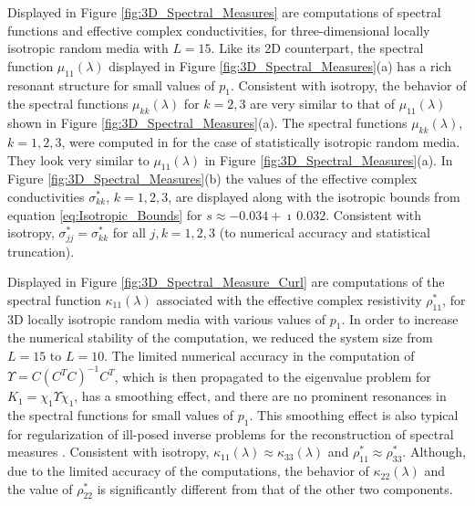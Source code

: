 \documentclass{cmslatex}
\begin{document}
Displayed in Figure \ref{fig:3D_Spectral_Measures} are 
computations of spectral functions and effective complex
conductivities, for three-dimensional locally isotropic random media
with $L=15$. Like its 2D counterpart, the spectral 
function $\mu_{11}(\lambda)$ displayed in Figure
\ref{fig:3D_Spectral_Measures}(a) has a rich resonant structure for
small values of $p_1$. Consistent with isotropy, the behavior of the
spectral functions $\mu_{kk}(\lambda)$ for $k=2,3$ are very similar to that of
$\mu_{11}(\lambda)$ shown in Figure \ref{fig:3D_Spectral_Measures}(a). The
spectral functions $\mu_{kk}(\lambda)$, $k=1,2,3$, were computed in
\cite{Murphy:JMP:063506} for the case of statistically isotropic
random media. They look very similar to $\mu_{11}(\lambda)$ in Figure
\ref{fig:3D_Spectral_Measures}(a). In Figure
\ref{fig:3D_Spectral_Measures}(b) the values of the effective complex
conductivities $\sigma^*_{kk}$, $k=1,2,3$, are displayed along with the
isotropic bounds from equation \eqref{eq:Isotropic_Bounds} for
$s\approx-0.034+\imath\,0.032$. Consistent with isotropy, $\sigma^*_{jj}=\sigma^*_{kk}$ for
all $j,k=1,2,3$ (to numerical accuracy and statistical truncation).




Displayed in Figure \ref{fig:3D_Spectral_Measure_Curl} are 
computations of the spectral function $\kappa_{11}(\lambda)$ associated with the
effective complex resistivity $\rho^*_{11}$, for 3D
locally isotropic random media with various values of $p_1$. In order
to increase the numerical stability of the computation, we reduced the 
system size from $L=15$ to $L=10$. The limited numerical accuracy
in the computation of $\Upsilon=C(C^TC)^{-1}C^T$, which is then propagated to
the eigenvalue problem for $K_1=\chi_1\Upsilon\chi_1$, has a smoothing effect, and
there are no prominent resonances in the spectral functions for small
values of $p_1$. This smoothing effect is also typical for
regularization of ill-posed inverse problems for the reconstruction of
spectral measures \cite{Cherkaev:IP-1203}. Consistent with isotropy,
$\kappa_{11}(\lambda)\approx\kappa_{33}(\lambda)$ and $\rho^*_{11}\approx\rho^*_{33}$. Although, due to the
limited accuracy of the computations, the behavior of $\kappa_{22}(\lambda)$ and
the value of $\rho^*_{22}$ is significantly different from that of the
other two components.  
 
\end{document}

